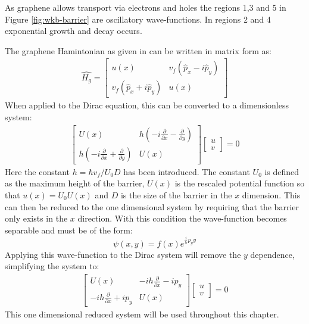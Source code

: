 		As graphene allows transport via electrons and holes the regions 1,3 and 5 in Figure \ref{fig:wkb-barrier} are oscillatory wave-functions. In regions 2 and 4 exponential growth and decay occurs.
	
		The graphene Hamintonian as given in \cite{b1} can be written in matrix form as:
		\begin{align}
			\hat{H_{g}}=
			\left[\begin{array}{cc}
				u\left(x\right)&v_{f}\left(\hat{p}_{x}-i\hat{p}_{y}\right)\\
				v_{f}\left(\hat{p}_{x}+i\hat{p}_{y}\right)&u\left(x\right)
			\end{array}\right]
		\end{align}
		When applied to the Dirac equation, this can be converted to a dimensionless system:
		\begin{align}
			\left[\begin{array}{cc}
				U\left(x\right)&h\left(-i\frac{\partial}{\partial x}-\frac{\partial}{\partial y}\right)\\
				h\left(-i\frac{\partial}{\partial x}+\frac{\partial}{\partial y}\right)&U\left(x\right)
			\end{array}\right]
			\left[\begin{array}{cc}
				u\\
				v
			\end{array}\right]
			=0
		\end{align}
		Here the constant $h=\hbar v_{f}/U_{0}D$ has been introduced. The constant $U_{0}$ is defined as the maximum height of the barrier, $U(x)$ is the rescaled potential function so that $u\left(x\right)=U_{0}U\left(x\right)$ and $D$ is the size of the barrier in the $x$ dimension. This can then be reduced to the one dimensional system by requiring that the barrier only exists in the $x$ direction. With this condition the wave-function becomes separable and must be of the form:
		\begin{equation}
			\psi\left(x,y\right)=f\left(x\right)e^{\frac{i}{h}p_{y}y}
		\end{equation}
		Applying this wave-function to the Dirac system will remove the $y$ dependence, simplifying the system to:
		\begin{align}
			\left[\begin{array}{cc}
				U\left(x\right)&-ih\frac{\partial}{\partial x}-ip_{y}\\
				-ih\frac{\partial}{\partial x}+ip_{y}&U\left(x\right)
			\end{array}\right]
			\left[\begin{array}{cc}
				u\\
				v
			\end{array}\right]
			=0
		\end{align}
		This one dimensional reduced system will be used throughout this chapter.
